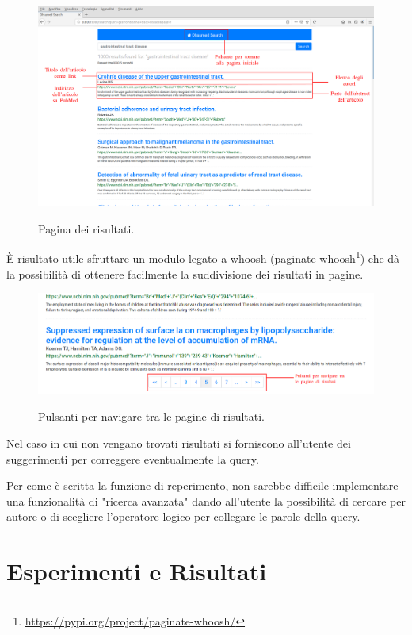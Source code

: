 \documentclass[runningheads]{llncs}
\begin{document}
\begin{figure}%
    \centering
    {{\includegraphics[width=1\linewidth]{risultati} }}%
    \caption{Pagina dei risultati.}%
\end{figure}

\`E risultato utile sfruttare un modulo legato a whoosh (paginate-whoosh\footnote{\url{https://pypi.org/project/paginate-whoosh/}})
che d\`a la possibilit\`a di ottenere facilmente la suddivisione dei risultati in pagine.

\begin{figure}%
    \centering
    {{\includegraphics[width=1\linewidth]{pagination} }}%
    \caption{Pulsanti per navigare tra le pagine di risultati.}%
\end{figure}

Nel caso in cui non vengano trovati risultati si forniscono all'utente dei
suggerimenti per correggere eventualmente la query.

Per come \`e scritta la funzione di reperimento, non sarebbe difficile
implementare una funzionalit\`a di "ricerca avanzata" dando all'utente la possibilit\`a 
di cercare per autore o di scegliere l'operatore logico per collegare le parole
della query.

\section{Esperimenti e Risultati}
\label{sec:esperimenti}
\end{document}
